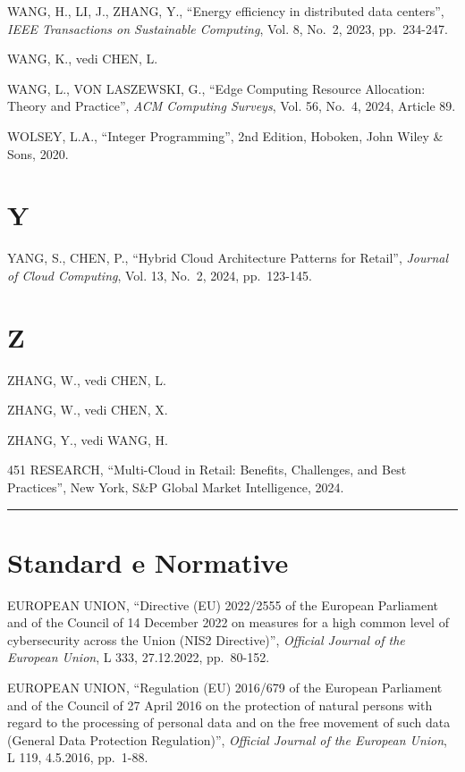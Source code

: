 \documentclass[12pt,a4paper,oneside]{book}
\numberwithin{figure}{chapter} %
\numberwithin{table}{chapter}  %
\begin{document}
WANG, H., LI, J., ZHANG, Y., ``Energy efficiency in distributed data
centers'', \emph{IEEE Transactions on Sustainable Computing}, Vol. 8,
No.~2, 2023, pp.~234-247.

WANG, K., vedi CHEN, L.

WANG, L., VON LASZEWSKI, G., ``Edge Computing Resource Allocation:
Theory and Practice'', \emph{ACM Computing Surveys}, Vol. 56, No.~4,
2024, Article 89.

WOLSEY, L.A., ``Integer Programming'', 2nd Edition, Hoboken, John Wiley
\& Sons, 2020.

\section{Y}\label{y}

YANG, S., CHEN, P., ``Hybrid Cloud Architecture Patterns for Retail'',
\emph{Journal of Cloud Computing}, Vol. 13, No.~2, 2024, pp.~123-145.

\section{Z}\label{z-1}

ZHANG, W., vedi CHEN, L.

ZHANG, W., vedi CHEN, X.

ZHANG, Y., vedi WANG, H.

451 RESEARCH, ``Multi-Cloud in Retail: Benefits, Challenges, and Best
Practices'', New York, S\&P Global Market Intelligence, 2024.

\begin{center}\rule{0.5\linewidth}{0.5pt}\end{center}

\section{Standard e Normative}\label{standard-e-normative}

EUROPEAN UNION, ``Directive (EU) 2022/2555 of the European Parliament
and of the Council of 14 December 2022 on measures for a high common
level of cybersecurity across the Union (NIS2 Directive)'',
\emph{Official Journal of the European Union}, L 333, 27.12.2022,
pp.~80-152.

EUROPEAN UNION, ``Regulation (EU) 2016/679 of the European Parliament
and of the Council of 27 April 2016 on the protection of natural persons
with regard to the processing of personal data and on the free movement
of such data (General Data Protection Regulation)'', \emph{Official
Journal of the European Union}, L 119, 4.5.2016, pp.~1-88.
\end{document}
